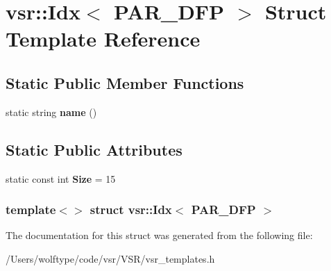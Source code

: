 \hypertarget{structvsr_1_1_idx_3_01_p_a_r___d_f_p_01_4}{\section{vsr\-:\-:Idx$<$ P\-A\-R\-\_\-\-D\-F\-P $>$ Struct Template Reference}
\label{structvsr_1_1_idx_3_01_p_a_r___d_f_p_01_4}
}
\subsection*{Static Public Member Functions}
\begin{DoxyCompactItemize}
\item 
\hypertarget{structvsr_1_1_idx_3_01_p_a_r___d_f_p_01_4_a5c429609911a482d613a93675f3a5fc9}{static string {\bfseries name} ()}\label{structvsr_1_1_idx_3_01_p_a_r___d_f_p_01_4_a5c429609911a482d613a93675f3a5fc9}

\end{DoxyCompactItemize}
\subsection*{Static Public Attributes}
\begin{DoxyCompactItemize}
\item 
\hypertarget{structvsr_1_1_idx_3_01_p_a_r___d_f_p_01_4_a4143e6178ab5ae9e7307798382f682b8}{static const int {\bfseries Size} = 15}\label{structvsr_1_1_idx_3_01_p_a_r___d_f_p_01_4_a4143e6178ab5ae9e7307798382f682b8}

\end{DoxyCompactItemize}
\subsubsection*{template$<$$>$ struct vsr\-::\-Idx$<$ P\-A\-R\-\_\-\-D\-F\-P $>$}



The documentation for this struct was generated from the following file\-:\begin{DoxyCompactItemize}
\item 
/\-Users/wolftype/code/vsr/\-V\-S\-R/vsr\-\_\-templates.\-h\end{DoxyCompactItemize}
